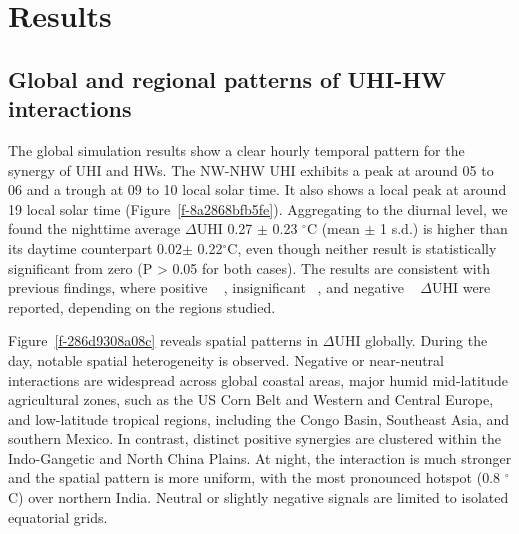 \section*{Results}

\bgroup
{}
\begin{figure*}[!htbp]
\centering \makeatletter{}
\makeatother 
\caption{{\textbf{Diurnal composite of UHI and HW interaction for all global cities.} The solid line represents the mean, and the shaded area represents +- one standard deviation.}}
\label{f-8a2868bfb5fe}
\end{figure*}
\egroup




\subsection*{Global and regional patterns of UHI-HW interactions }The global simulation results show a clear hourly temporal pattern for the synergy of UHI and HWs. The NW-NHW UHI exhibits a peak at around 05 to 06 and a trough at 09 to 10 local solar time. It also shows a local peak at around 19 local solar time (Figure~\ref{f-8a2868bfb5fe}). Aggregating to the diurnal level, we found the nighttime average  \ensuremath{\Delta }UHI 0.27 \ensuremath{\pm} 0.23 \ensuremath{^\circ}C (mean \ensuremath{\pm} 1 s.d.) is higher than its daytime counterpart 0.02\ensuremath{\pm} 0.22\ensuremath{^\circ}C, even though neither result is statistically significant from zero (P {\textgreater} 0.05 for both cases). The results are consistent with previous findings, where positive \unskip~\cite{2755510:33598935,2755510:33598909,2755510:33598908,2755510:33598952} , insignificant\unskip~\cite{2755510:33598915} , and negative \unskip~\cite{2755510:33598943,2755510:33598907,2755510:33598905,2755510:33598896}  \ensuremath{\Delta }UHI were reported, depending on the regions studied.

Figure~\ref{f-286d9308a08c} reveals spatial patterns in \ensuremath{\Delta }UHI globally. During the day, notable spatial heterogeneity is observed. Negative or near-neutral interactions are widespread across global coastal areas, major humid mid-latitude agricultural zones, such as the US Corn Belt and Western and Central Europe, and low-latitude tropical regions, including the Congo Basin, Southeast Asia, and southern Mexico. In contrast, distinct positive synergies are clustered within the Indo-Gangetic and North China Plains. At night, the interaction is much stronger and the spatial pattern is more uniform, with the most pronounced hotspot (0.8 \ensuremath{^\circ}C) over northern India. Neutral or slightly negative signals are limited to isolated equatorial grids.


